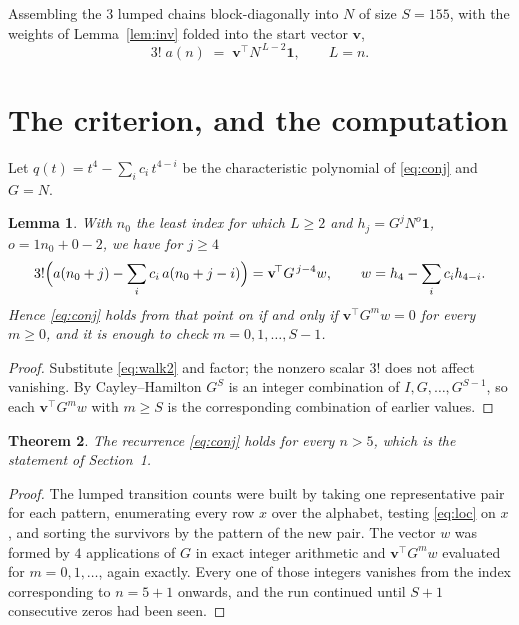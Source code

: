 \documentclass[11pt,a4paper]{article}
\theoremstyle{plain}
\newtheorem{theorem}{Theorem}
\newtheorem{lemma}[theorem]{Lemma}
\theoremstyle{definition}
\begin{document}
Assembling the $3$ lumped chains block-diagonally into $N$ of size $S=155$, with the
weights of Lemma~\ref{lem:inv} folded into the start vector $\mathbf{v}$,
\begin{equation}\label{eq:walk2}
3!\;a(n)\;=\;\mathbf{v}^{\!\top}N^{\,L-2}\mathbf{1},\qquad L=n .
\end{equation}

\section{The criterion, and the computation}

Let $q(t)=t^{4}-\sum_i c_i\,t^{4-i}$ be the characteristic polynomial of
\eqref{eq:conj} and $G=N$.

\begin{lemma}\label{lem:crit}
With $n_0$ the least index for which $L\ge2$ and $h_j=G^{j}N^{o}\mathbf{1}$,
$o=1n_0+0-2$, we have for $j\ge4$
\[
3!\Bigl(a(n_0+j)-\sum_i c_i\,a(n_0+j-i)\Bigr)
=\mathbf{v}^{\!\top}G^{\,j-4}w,\qquad
w=h_{4}-\sum_i c_i h_{4-i} .
\]
Hence \eqref{eq:conj} holds from that point on if and only if
$\mathbf{v}^{\!\top}G^{m}w=0$ for every $m\ge0$, and it is enough to check
$m=0,1,\dots,S-1$.
\end{lemma}

\begin{proof}
Substitute \eqref{eq:walk2} and factor; the nonzero scalar $3!$ does not affect
vanishing. By Cayley--Hamilton $G^{S}$ is an integer combination of $I,G,\dots,G^{S-1}$,
so each $\mathbf{v}^{\!\top}G^{m}w$ with $m\ge S$ is the corresponding combination of
earlier values.
\end{proof}

\begin{theorem}
The recurrence \eqref{eq:conj} holds for every $n>5$, which is the statement of
Section~1.
\end{theorem}

\begin{proof}
The lumped transition counts were built by taking one representative pair for each pattern,
enumerating every row $x$ over the alphabet, testing \eqref{eq:loc} on $x$, and sorting
the survivors by the pattern of the new pair. The vector $w$ was formed by $4$
applications of $G$ in exact integer arithmetic and $\mathbf{v}^{\!\top}G^{m}w$
evaluated for $m=0,1,\dots$, again exactly. Every one of those integers vanishes from the
index corresponding to $n=5+1$ onwards, and the run continued until $S+1$ consecutive
zeros had been seen.
\end{proof}
\end{document}
